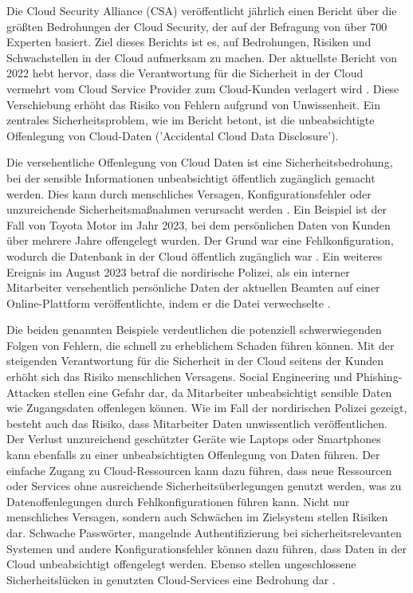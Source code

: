Die Cloud Security Alliance (CSA) veröffentlicht jährlich einen Bericht über die größten Bedrohungen der Cloud Security, der auf der Befragung von über 700 Experten basiert. Ziel dieses Berichts ist es, auf Bedrohungen, Risiken und Schwachstellen in der Cloud aufmerksam zu machen. Der aktuellste Bericht von 2022 hebt hervor, dass die Verantwortung für die Sicherheit in der Cloud vermehrt vom Cloud Service Provider zum Cloud-Kunden verlagert wird \cite{CloudSecurityAlliance.2022}. %
Diese Verschiebung erhöht das Risiko von Fehlern aufgrund von Unwissenheit. Ein zentrales Sicherheitsproblem, wie im Bericht betont, ist die unbeabsichtigte Offenlegung von Cloud-Daten ('Accidental Cloud Data Disclosure').

Die versehentliche Offenlegung von Cloud Daten ist eine Sicherheitsbedrohung, bei der sensible Informationen unbeabsichtigt öffentlich zugänglich gemacht werden. Dies kann durch menschliches Versagen, Konfigurationsfehler oder unzureichende Sicherheitsmaßnahmen verursacht werden \cite{CloudSecurityAlliance.2022}. %
Ein Beispiel ist der Fall von Toyota Motor im Jahr 2023, bei dem persönlichen Daten von Kunden über mehrere Jahre offengelegt wurden. Der Grund war eine Fehlkonfiguration, wodurch die Datenbank in der Cloud öffentlich zugänglich war \cite{Whittaker.2023}.
Ein weiteres Ereignis im August 2023 betraf die nordirische Polizei, als ein interner Mitarbeiter versehentlich persönliche Daten der aktuellen Beamten auf einer Online-Plattform veröffentlichte, indem er die Datei verwechselte \cite{PSNI.2023}.

Die beiden genannten Beispiele verdeutlichen die potenziell schwerwiegenden Folgen von Fehlern, die schnell zu erheblichem Schaden führen können. Mit der steigenden Verantwortung für die Sicherheit in der Cloud seitens der Kunden erhöht sich das Risiko menschlichen Versagens. Social Engineering und Phishing-Attacken stellen eine Gefahr dar, da Mitarbeiter unbeabsichtigt sensible Daten wie Zugangsdaten offenlegen können. Wie im Fall der nordirischen Polizei gezeigt, besteht auch das Risiko, dass Mitarbeiter Daten unwissentlich veröffentlichen. Der Verlust unzureichend geschützter Geräte wie Laptops oder Smartphones kann ebenfalls zu einer unbeabsichtigten Offenlegung von Daten führen. Der einfache Zugang zu Cloud-Ressourcen kann dazu führen, dass neue Ressourcen oder Services ohne ausreichende Sicherheitsüberlegungen genutzt werden, was zu Datenoffenlegungen durch Fehlkonfigurationen führen kann. Nicht nur menschliches Versagen, sondern auch Schwächen im Zielsystem stellen Risiken dar. Schwache Passwörter, mangelnde Authentifizierung bei sicherheitsrelevanten Systemen und andere Konfigurationsfehler können dazu führen, dass Daten in der Cloud unbeabsichtigt offengelegt werden. Ebenso stellen ungeschlossene Sicherheitslücken in genutzten Cloud-Services eine Bedrohung dar \cite{Trabelsi.2019}\cite{Brindha.2015}.

